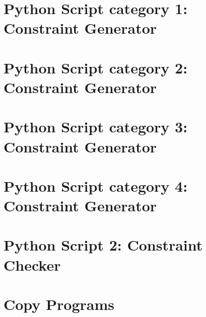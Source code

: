 \documentclass[project,twoside]{iitbreport}
\begin{document}
\renewcommand{\abstractname}{\LARGE Acknowledgements}


{}
\let\cleardoublepage\clearpage
\tableofcontents
\listoffigures
\lstlistoflistings
\newpage
\let\cleardoublepage\clearpage
\setcounter{page}{1}








\begin{appendices}
	\chapter{Python Script category 1: Constraint Generator}
	\label{ch:p1}
	
	\chapter{Python Script category 2: Constraint Generator}
	\label{ch:p2}
	
	\chapter{Python Script category 3: Constraint Generator}
	\label{ch:p3}
	
	\chapter{Python Script category 4: Constraint Generator}
	\label{ch:p4}
	
	\chapter{Python Script 2: Constraint Checker}
	\label{ch:script2}
	
	\chapter{Copy Programs}
	\label{ch:programs}
	
	
\end{appendices}



%
\end{document}
